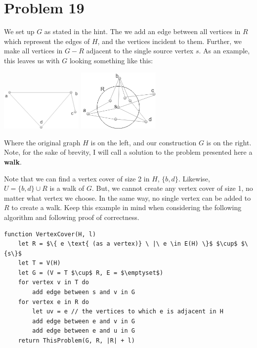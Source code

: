 \documentclass{article}
\providecommand{\prob}[1]{\section*{Problem #1}}
\begin{document}
\pagebreak
\prob{19}

We set up $G$ as stated in the hint.
The we add an edge between all vertices in $R$ which represent the edges of $H$, and the vertices incident to them.
Further, we make all vertices in $G - R$ adjacent to the single source vertex $s$.
As an example, this leaves us with $G$ looking something like this:

\begin{center}
    \includegraphics[width=0.3\textwidth]{a21p19first}
    \includegraphics[width=0.3\textwidth]{a21p19graph}
\end{center}

Where the original graph $H$ is on the left, and our construction $G$ is on the right. Note, for the sake of brevity, I will call a solution to the problem presented here a \textbf{walk}.

Note that we can find a vertex cover of size 2 in $H$, $\{b, d\}$.
Likewise, $U = \{b, d\} \cup R$ is a walk of $G$.
But, we cannot create any vertex cover of size 1, no matter what vertex we choose.
In the same way, no single vertex can be added to $R$ to create a walk.
Keep this example in mind when considering the following algorithm and following proof of correctness.

\begin{lstlisting}
function VertexCover(H, l)
    let R = $\{ e \text{ (as a vertex)} \ |\ e \in E(H) \}$ $\cup$ $\{s\}$
    let T = V(H)
    let G = (V = T $\cup$ R, E = $\emptyset$)
    for vertex v in T do
        add edge between s and v in G
    for vertex e in R do
        let uv = e // the vertices to which e is adjacent in H
        add edge between e and v in G
        add edge between e and u in G
    return ThisProblem(G, R, |R| + l)
\end{lstlisting}
\end{document}
